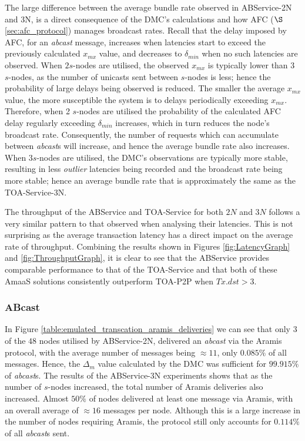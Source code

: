     The large difference between the average bundle rate observed in ABService-2N and 3N, is a direct consequence of the DMC's calculations and how AFC ($\S$ \ref{sec:afc_protocol}) manages broadcast rates.  Recall that the delay imposed by AFC, for an \emph{abcast} message, increases when latencies start to exceed the previously calculated $x_{mx}$ value, and decreases to $\delta_{min}$ when no such latencies are observed.  When $2 s$-nodes are utilised, the observed $x_{mx}$ is typically lower than 3 $s$-nodes, as the number of unicasts sent between $s$-nodes is less; hence the probability of large delays being observed is reduced.  The smaller the average $x_{mx}$ value, the more susceptible the system is to delays periodically exceeding $x_{mx}$.  Therefore, when 2 $s$-nodes are utilised the probability of the calculated AFC delay regularly exceeding $\delta_{min}$ increases, which in turn reduces the node's broadcast rate.  Consequently, the number of requests which can accumulate between \emph{abcast}s will increase, and hence the average bundle rate also increases.  When $3 s$-nodes are utilised, the DMC's observations are typically more stable, resulting in less \emph{outlier} latencies being recorded and the broadcast rate being more stable; hence an average bundle rate that is approximately the same as the TOA-Service-3N.  
	
	The throughput of the ABService and TOA-Service for both $2N$ and $3N$ follows a very similar pattern to that observed when analysing their latencies.  This is not surprising as the average transaction latency has a direct impact on the average rate of throughput.  Combining the results shown in Figures \ref{fig:LatencyGraph} and \ref{fig:ThroughputGraph}, it is clear to see that the ABService provides comparable performance to that of the TOA-Service and that both of these \textsf{AmaaS} solutions consistently outperform TOA-P2P when $Tx.dst > 3$.  
	
	\subsubsection*{ABcast}
	In Figure \ref{table:emulated_transcation_aramis_deliveries} we can see that only $3$ of the $48$ nodes utilised by ABService-2N, delivered an \emph{abcast} via the \textsf{Aramis} protocol, with the average number of messages being $\approx 11$, only $0.085\%$ of all messages.  Hence, the $\Delta_m$ value calculated by the DMC was sufficient for  $99.915\%$ of \emph{abcast}s.  The results of the ABService-3N experiments shows that as the number of $s$-nodes increased,  the total number of \textsf{Aramis} deliveries also increased.  Almost $50\%$ of nodes delivered at least one message via \textsf{Aramis}, with an overall average of $\approx 16$ messages per node.  Although this is a large increase in the number of nodes requiring \textsf{Aramis}, the protocol still only accounts for $0.114\%$ of all \emph{abcast}s sent.  
	

